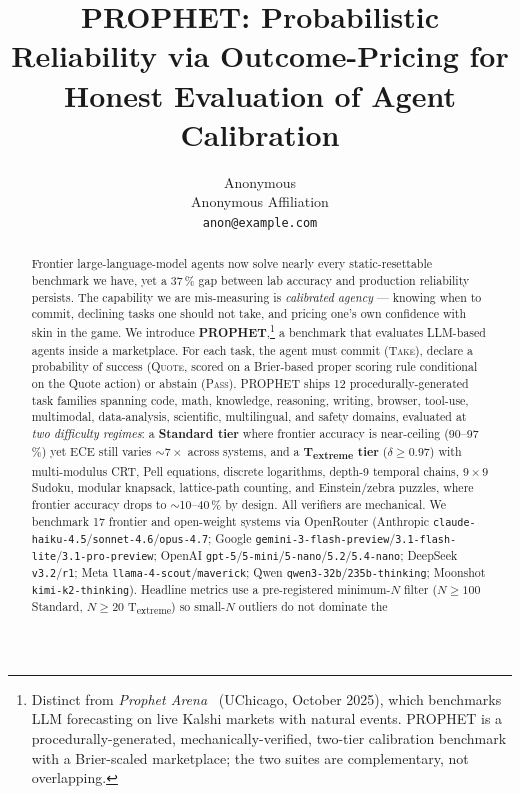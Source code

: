 \documentclass[11pt]{article}
\title{PROPHET: Probabilistic Reliability via Outcome-Pricing for Honest Evaluation of Agent Calibration}
\author{Anonymous \\ Anonymous Affiliation \\ \texttt{anon@example.com}}
\begin{document}
\maketitle

\begin{abstract}
Frontier large-language-model agents now solve nearly every
static-resettable benchmark we have, yet a 37\,\% gap between lab
accuracy and production reliability persists. The capability we are
mis-measuring is \emph{calibrated agency} --- knowing when to commit,
declining tasks one should not take, and pricing one's own confidence
with skin in the game. We introduce \textbf{PROPHET},\footnote{Distinct from
\emph{Prophet Arena}~\cite{prophet_arena} (UChicago, October 2025), which
benchmarks LLM forecasting on live Kalshi markets with natural events.
PROPHET is a procedurally-generated, mechanically-verified, two-tier
calibration benchmark with a Brier-scaled marketplace; the two suites
are complementary, not overlapping.} a benchmark that evaluates
LLM-based agents inside a marketplace. For each task, the
agent must commit (\textsc{Take}), declare a probability of success
(\textsc{Quote}, scored on a Brier-based proper scoring rule conditional
on the Quote action) or abstain (\textsc{Pass}). PROPHET ships 12
procedurally-generated task families spanning code, math, knowledge,
reasoning, writing, browser, tool-use, multimodal, data-analysis,
scientific, multilingual, and safety domains, evaluated at \emph{two
difficulty regimes}: a \textbf{Standard tier} where frontier accuracy is
near-ceiling (90--97\,\%) yet ECE still varies $\sim$$7\times$ across
systems, and a \textbf{T\textsubscript{extreme} tier} ($\delta \ge 0.97$)
with multi-modulus CRT, Pell equations, discrete logarithms, depth-9
temporal chains, $9\times 9$ Sudoku, modular knapsack, lattice-path
counting, and Einstein/zebra puzzles, where frontier accuracy drops to
$\sim$10--40\,\% by design. All verifiers are mechanical. We benchmark
17 frontier and open-weight systems via OpenRouter (Anthropic
\texttt{claude-haiku-4.5}/\texttt{sonnet-4.6}/\texttt{opus-4.7}; Google
\texttt{gemini-3-flash-preview}/\texttt{3.1-flash-lite}/\texttt{3.1-pro-preview};
OpenAI \texttt{gpt-5}/\texttt{5-mini}/\texttt{5-nano}/\texttt{5.2}/\texttt{5.4-nano};
DeepSeek \texttt{v3.2}/\texttt{r1}; Meta \texttt{llama-4-scout}/\texttt{maverick};
Qwen \texttt{qwen3-32b}/\texttt{235b-thinking}; Moonshot
\texttt{kimi-k2-thinking}). Headline metrics use a pre-registered
minimum-$N$ filter ($N \ge 100$ Standard, $N \ge 20$
T\textsubscript{extreme}) so small-$N$ outliers do not dominate the
$$
\end{abstract}
\end{document}
